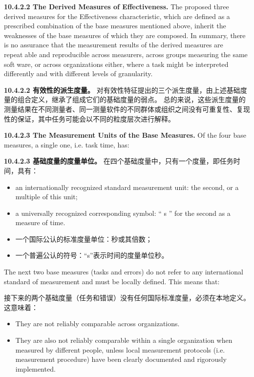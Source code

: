 \textbf{10.4.2.2 The Derived Measures of Effectiveness.} The proposed three 
derived measures for the Effectiveness characteristic, which are defined as 
a prescribed combination of the base measures mentioned above, inherit the 
weaknesses of the base measures of which they are composed. In summary, there 
is no assurance that the measurement results of the derived measures are repeat￾able and reproducible across measurers, across groups measuring the same soft￾ware, or across organizations either, where a task might be interpreted differently 
and with different levels of granularity.

\textbf{10.4.2.2 有效性的派生度量。} 对有效性特征提出的三个派生度量，由上述基础度量的组合定义，继承了组成它们的基础度量的弱点。
总的来说，这些派生度量的测量结果在不同测量者、同一测量软件的不同群体或组织之间没有可重复性、复现性的保证，其中任务可能会以不同的粒度层次进行解释。

\textbf{10.4.2.3 The Measurement Units of the Base Measures.} Of the four base measures, a single one, i.e. task time, has:

\textbf{10.4.2.3 基础度量的度量单位。} 在四个基础度量中，只有一个度量，即任务时间，具有：

\begin{itemize}
 \item an internationally recognized standard measurement unit: the second, or a 
multiple of this unit; 
 \item a universally recognized corresponding symbol: “ s ” for the second as a 
measure of time.
\end{itemize}

\begin{itemize}
\item 一个国际公认的标准度量单位：秒或其倍数；
\item 一个普遍公认的符号：“s”表示时间的度量单位秒。
\end{itemize}

The next two base measures (tasks and errors) do not refer to any international 
standard of measurement and must be locally defined. This means that:

接下来的两个基础度量（任务和错误）没有任何国际标准度量，必须在本地定义。这意味着：

\begin{itemize}
\item They are not reliably comparable across organizations. 
\item They are also not reliably comparable within a single organization when 
measured by different people, unless local measurement protocols (i.e. 
measurement procedure) have been clearly documented and rigorously 
implemented.
\end{itemize}


